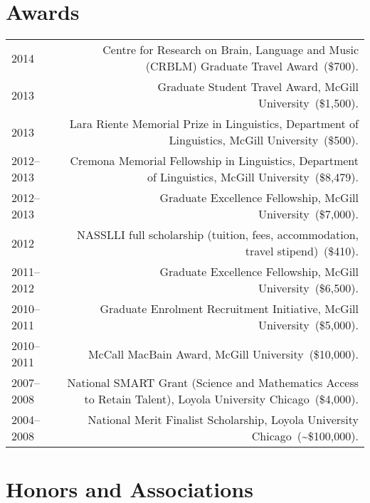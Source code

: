 \documentclass[letterpaper]{article}
\makeatletter
\newcommand{\myvrule}{\color{lightgray}\vrule width 1.0pt}
\newenvironment{cvsection}{%
  \renewcommand{\arraystretch}{1.75}
  \begin{longtable}[l]{@{} L R @{}}
}{%
  \end{longtable}
}
\newcommand{\award}[2]{%
  #1~(#2). %
}
\makeatother
\begin{document}
\section*{Awards}

\begin{cvsection}
  2014 & \award{Centre for Research on Brain, Language and Music (CRBLM)
  Graduate Travel Award}{\$700} \\

  2013 & \award{Graduate Student Travel Award, McGill University}{\$1,500} \\

  2013 & \award{Lara Riente Memorial Prize in Linguistics, Department of
  Linguistics, McGill University}{\$500} \\

  2012--2013 & \award{Cremona Memorial Fellowship in Linguistics, Department of
  Linguistics, McGill University}{\$8,479} \\

  2012--2013 & \award{Graduate Excellence Fellowship, McGill
  University}{\$7,000} \\

  2012 & \award{NASSLLI full scholarship (tuition, fees, accommodation, travel
  stipend)}{\$410} \\

  2011--2012 & \award{Graduate Excellence Fellowship, McGill
  University}{\$6,500} \\

  2010--2011 & \award{Graduate Enrolment Recruitment Initiative, McGill
  University}{\$5,000} \\

  2010--2011 & \award{McCall MacBain Award, McGill University}{\$10,000} \\

  2007--2008 & \award{National SMART Grant (Science and Mathematics Access to
  Retain Talent), Loyola University Chicago}{\$4,000} \\

  2004--2008 & \award{National Merit Finalist Scholarship, Loyola University
  Chicago}{\textasciitilde\$100,000} \\
\end{cvsection}



\section*{Honors and Associations}
\end{document}
